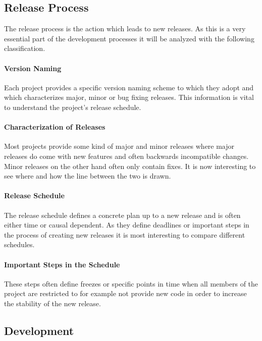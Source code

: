 \subsection{Release Process}

The release process is the action which leads to new releases. As this is a
very essential part of the development processes it will be analyzed with the
following classification.

\paragraph{Version Naming}

Each project provides a specific version naming scheme to which they adopt and
which characterizes major, minor or bug fixing releases. This information is
vital to understand the project's release schedule.

\paragraph{Characterization of Releases}

Most projects provide some kind of major and minor releases where major
releases do come with new features and often backwards incompatible changes.
Minor releases on the other hand often only contain fixes. It is now
interesting to see where and how the line between the two is drawn.

\paragraph{Release Schedule}

The release schedule defines a concrete plan up to a new release and is often
either time or causal dependent. As they define deadlines or important steps in
the process of creating new releases it is most interesting to compare
different schedules.

\paragraph{Important Steps in the Schedule}

These steps often define freezes or specific points in time when all members of
the project are restricted to for example not provide new code in order to
increase the stability of the new release.

\subsection{Development}

